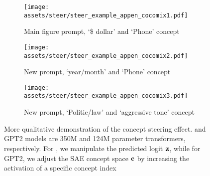 \begin{figure*}[!ht]
    \centering
    \begin{subfigure}{\textwidth}
        \centering
        \texttt{[image: assets/steer/steer\_example\_appen\_cocomix1.pdf]}
    \caption{Main figure prompt, `\$ dollar' and `Phone' concept}
    \end{subfigure}
    \begin{subfigure}{\textwidth}
        \centering
        \texttt{[image: assets/steer/steer\_example\_appen\_cocomix2.pdf]}
    \caption{New prompt, `year/month' and `Phone' concept}
    \end{subfigure}
    \begin{subfigure}{\textwidth}
        \centering
        \texttt{[image: assets/steer/steer\_example\_appen\_cocomix3.pdf]}
    \caption{New prompt, `Politic/law' and `aggressive tone' concept}
    \end{subfigure}
    \caption{More qualitative demonstration of the concept steering effect. \sname and GPT2 models are 350M and 124M parameter transformers, respectively. For \sname, we manipulate the predicted logit ${\mathbf{z}}$, while for GPT2, we adjust the SAE concept space ${\mathbf{c}}$ by increasing the activation of a specific concept index}
    \label{fig:appn_qualitative_analysis}
\end{figure*}
